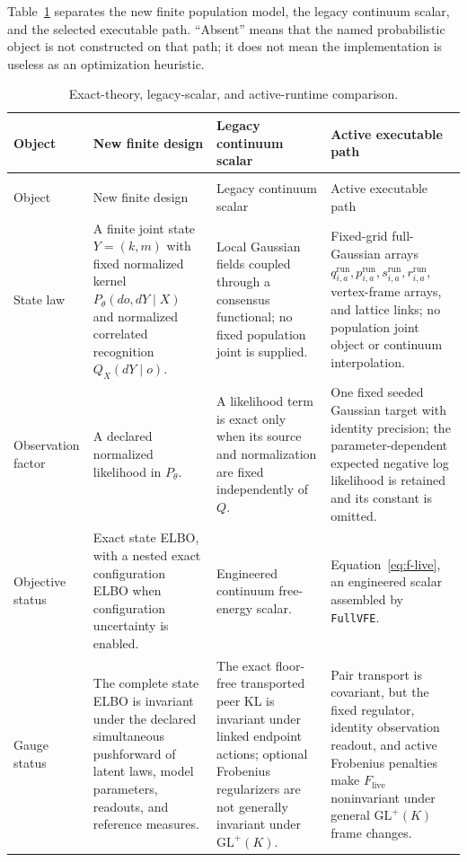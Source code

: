 Table~\ref{tab:runtime-three-way} separates the new finite population model, the legacy continuum scalar, and the selected executable path. ``Absent'' means that the named probabilistic object is not constructed on that path; it does not mean the implementation is useless as an optimization heuristic.

\begin{longtable}{>{\raggedright\arraybackslash}p{}>{\raggedright\arraybackslash}p{}>{\raggedright\arraybackslash}p{}>{\raggedright\arraybackslash}p{}}
\caption{Exact-theory, legacy-scalar, and active-runtime comparison.}
\label{tab:runtime-three-way}\\
\toprule
Object & New finite design & Legacy continuum scalar & Active executable path \\
\midrule
\endfirsthead
\multicolumn{4}{l}{\textit{Table \thetable\ continued}}\\
\toprule
Object & New finite design & Legacy continuum scalar & Active executable path \\
\midrule
\endhead
State law & A finite joint state $Y=(k,m)$ with fixed normalized kernel $P_\theta(do,dY\mid X)$ and normalized correlated recognition $Q_X(dY\mid o)$. & Local Gaussian fields coupled through a consensus functional; no fixed population joint is supplied. & Fixed-grid full-Gaussian arrays $q_{i,a}^{\mathrm{run}},p_{i,a}^{\mathrm{run}},s_{i,a}^{\mathrm{run}},r_{i,a}^{\mathrm{run}}$, vertex-frame arrays, and lattice links; no population joint object or continuum interpolation. \\
Observation factor & A declared normalized likelihood in $P_\theta$. & A likelihood term is exact only when its source and normalization are fixed independently of $Q$. & One fixed seeded Gaussian target with identity precision; the parameter-dependent expected negative log likelihood is retained and its constant is omitted. \\
Objective status & Exact state ELBO, with a nested exact configuration ELBO when configuration uncertainty is enabled. & Engineered continuum free-energy scalar. & Equation~\eqref{eq:f-live}, an engineered scalar assembled by \texttt{FullVFE}. \\
Gauge status & The complete state ELBO is invariant under the declared simultaneous pushforward of latent laws, model parameters, readouts, and reference measures. & The exact floor-free transported peer KL is invariant under linked endpoint actions; optional Frobenius regularizers are not generally invariant under $\mathrm{GL}^{+}(K)$. & Pair transport is covariant, but the fixed regulator, identity observation readout, and active Frobenius penalties make $F_{\mathrm{live}}$ noninvariant under general $\mathrm{GL}^{+}(K)$ frame changes. \\

\end{longtable}
